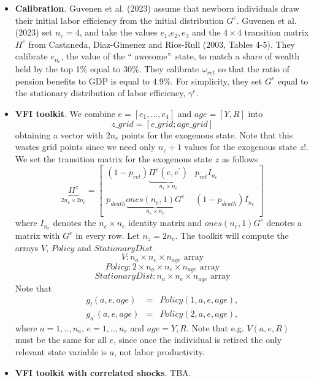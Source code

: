 \documentclass[12pt]{article}
\begin{document}
\begin{itemize}
\item \textbf{Calibration}. Guvenen et al. (2023) assume that newborn
individuals draw their initial labor efficiency from the initial
distribution $G^{e}$. Guvenen et al. (2023) set $n_{e}=4$, and take the
values $e_{1}$,$e_{2},e_{3}$ and the $4\times 4$ transition matrix $\Pi ^{e}$
from Castaneda, Diaz-Gimenez and Rios-Rull (2003, Tables 4-5). They
calibrate $e_{n_{e}}$, the value of the \textquotedblleft
awesome\textquotedblright\ state, to match a share of wealth held by the top
1\% equal to $30\%$. They calibrate $\omega _{ret}$ so that the ratio of
pension benefits to GDP is equal to $4.9\%$. For simplicity, they set $G^{e}$
equal to the stationary distribution of labor efficiency, $\gamma ^{e}$.

\item \textbf{VFI toolkit}. We combine $e=\left[ e_{1},\ldots ,e_{4}\right] $
and $age=[Y,R]$ into 
\begin{equation*}
z\_grid=[e\_grid;age\_grid]
\end{equation*}%
obtaining a vector with $2n_{e}$ points for the exogenous state. Note that
this wastes grid points since we need only $n_{e}+1$ values for the
exogenous state $z$!. We set the transition matrix for the exogenous state $z
$ as follows%
\begin{equation*}
\underbrace{\Pi ^{z}}_{2n_{e}\times 2n_{e}}=%
\begin{bmatrix}
\left( 1-p_{ret}\right) \underbrace{\Pi ^{e}(e,e^{\prime })}_{n_{e}\times
n_{e}} & p_{ret}I_{n_{e}} \\ 
p_{death}\underbrace{ones(n_{e},1)G^{e}}_{n_{e}\times n_{e}} & \left(
1-p_{death}\right) I_{n_{e}}%
\end{bmatrix}%
\end{equation*}%
where $I_{n_{e}}$ denotes the $n_{e}\times n_{e}$ identity matrix and $%
ones(n_{e},1)G^{e}$ denotes a matrix with $G^{e}$ in every row. Let $%
n_{z}=2n_{e}$. The toolkit will compute the arrays $V$, $Policy$ and $%
StationaryDist$%
\begin{equation*}
V:n_{a}\times n_{e}\times n_{age}\text{ array}
\end{equation*}%
\begin{equation*}
Policy:2\times n_{a}\times n_{e}\times n_{age}\text{ array}
\end{equation*}%
\begin{equation*}
StationaryDist:n_{a}\times n_{e}\times n_{age}\text{ array}
\end{equation*}%
Note that 
\begin{eqnarray*}
g_{l}(a,e,age) &=&Policy(1,a,e,age), \\
g_{a^{\prime }}(a,e,age) &=&Policy(2,a,e,age),
\end{eqnarray*}%
where $a=1,..,n_{a}$, $e=1,..,n_{e}$ and $age=Y,R$. Note that e.g. $V(a,e,R)$
must be the same for all $e$, since once the individual is retired the only
relevant state variable is $a$, not labor productivity.

\item \textbf{VFI toolkit with correlated shocks}. TBA.
\end{itemize}
\end{document}

